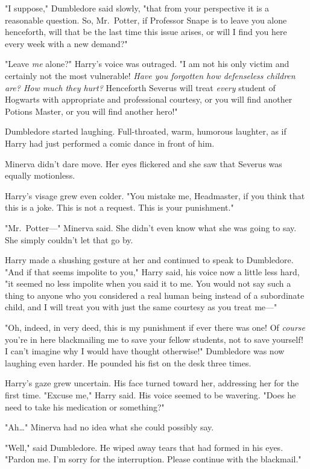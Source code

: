 "I suppose," Dumbledore said slowly, "that from your perspective it is a 
reasonable question. So, Mr.~Potter, if Professor Snape is to leave you alone 
henceforth, will that be the last time this issue arises, or will I find you 
here every week with a new demand?"

"Leave \emph{me} alone?" Harry's voice was outraged. "I am not his only victim 
and certainly not the most vulnerable! \emph{Have you forgotten how defenseless 
children are? How much they hurt?} Henceforth Severus will treat \emph{every} 
student of Hogwarts with appropriate and professional courtesy, or you will 
find another Potions Master, or you will find another hero!"

Dumbledore started laughing. Full-throated, warm, humorous laughter, as if 
Harry had just performed a comic dance in front of him.

Minerva didn't dare move. Her eyes flickered and she saw that Severus was 
equally motionless.

Harry's visage grew even colder. "You mistake me, Headmaster, if you think that 
this is a joke. This is not a request. This is your punishment."

"Mr.~Potter---" Minerva said. She didn't even know what she was going to say. 
She simply couldn't let that go by.

Harry made a shushing gesture at her and continued to speak to Dumbledore. "And 
if that seems impolite to you," Harry said, his voice now a little less hard, 
"it seemed no less impolite when you said it to me. You would not say such a 
thing to anyone who you considered a real human being instead of a subordinate 
child, and I will treat you with just the same courtesy as you treat me---"

"Oh, indeed, in very deed, this is my punishment if ever there was one! Of 
\emph{course} you're in here blackmailing me to save your fellow students, not 
to save yourself! I can't imagine why I would have thought otherwise!" 
Dumbledore was now laughing even harder. He pounded his fist on the desk three 
times.

Harry's gaze grew uncertain. His face turned toward her, addressing her for the 
first time. "Excuse me," Harry said. His voice seemed to be wavering. "Does he 
need to take his medication or something?"

"Ah{\ldots}" Minerva had no idea what she could possibly say.

"Well," said Dumbledore. He wiped away tears that had formed in his eyes. 
"Pardon me. I'm sorry for the interruption. Please continue with the blackmail."

